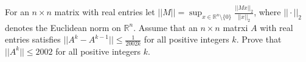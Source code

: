 For an $n\times n$ matrix with real entries let $||M||=\sup_{x\in \mathbb{R}^{n}\setminus\{0\}}\frac{||Mx||_{2}}{||x||_{2}}$, where
$||\cdot||_{2}$ denotes the Euclidean norm on $\mathbb{R}^{n}$. Assume that an $n\times n$ matrxi $A$ with real entries satisfies $||A^{k}-A^{k-1}||\leq\frac{1}{2002k}$ for all positive integers $k$. Prove that $||A^{k}||\leq 2002$ for all positive integers $k$.